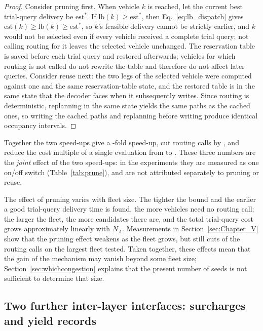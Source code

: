 \begin{proof}
  Consider pruning first. When vehicle $k$ is reached, let the current best trial-query delivery be $\mathrm{est}^{\ast}$.
  If $\mathrm{lb}(k)\ge \mathrm{est}^{\ast}$, then Eq.~\eqref{eq:lb_dispatch} gives
  $\mathrm{est}(k)\ge\mathrm{lb}(k)\ge\mathrm{est}^{\ast}$,
  so $k$'s feasible delivery cannot be strictly earlier, and $k$ would not be selected even if every vehicle received a complete trial query; not calling routing for it leaves the selected vehicle unchanged.
  The reservation table is saved before each trial query and restored afterwards; vehicles for which routing is not called do not rewrite the table and therefore do not affect later queries.
  Consider reuse next: the two legs of the selected vehicle were computed against one and the same reservation-table state, and the restored table is in the same state that the decoder faces when it subsequently writes.
  Since routing is deterministic, replanning in the same state yields the same paths as the cached ones, so writing the cached paths and replanning before writing produce identical occupancy intervals.
\end{proof}

Together the two speed-ups give a \SpeedupProbe{}-fold speed-up, cut routing calls by \RouteCallCut{}, and reduce the cost multiple of a single evaluation from \CostMultBefore{} to \CostMultAfter{}.
These three numbers are the \emph{joint} effect of the two speed-ups: in the experiments they are measured as one on/off switch (Table~\ref{tab:prune}), and are not attributed separately to pruning or reuse.

The effect of pruning varies with fleet size. The tighter the bound and the earlier a good trial-query delivery time is found, the more vehicles need no routing call; the larger the fleet, the more candidates there are, and the total trial-query cost grows approximately linearly with $N_A$.
Measurements in Section~\ref{sec:Chapter_V} show that the pruning effect weakens as the fleet grows, but still cuts \RouteCallCutLo{} of the routing calls on the largest fleet tested.
Taken together, these effects mean that the gain of the mechanism may vanish beyond some fleet size; Section~\ref{sec:whichcongestion} explains that the present number of seeds is not sufficient to determine that size.

\subsection{Two further inter-layer interfaces: surcharges and yield records}
\label{sec:interface}

